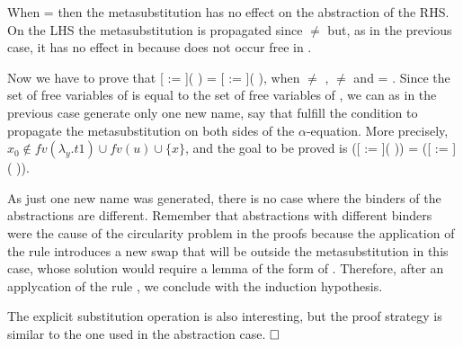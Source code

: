 \begin{coqdoccode}
\end{coqdoccode}
When  =  then the metasubstitution has no effect on the abstraction of the RHS. On the LHS the metasubstitution is propagated since  \ensuremath{\not=}  but, as in the previous case, it has no effect in  because  does not occur free in .
\begin{coqdoccode}
\end{coqdoccode}
Now we have to prove that [ := ](  ) = [ := ](  ), when  \ensuremath{\not=} ,  \ensuremath{\not=}  and    =   . Since the set of free variables of    is equal to the set of free variables of   , we can as in the previous case generate only one new name, say  that fulfill the condition to propagate the metasubstitution on both sides of the $\alpha$-equation. More precisely, $x_0 \notin fv(\lambda_y.t1) \cup fv(u) \cup \{x\}$, and the goal to be proved is   ([ := ](   )) =   ([ := ](   )).
\begin{coqdoccode}
\end{coqdoccode}
As just one new name was generated, there is no case where the binders of the abstractions are different. Remember that abstractions with different binders were the cause of the circularity problem in the proofs because the application of the rule  introduces a new swap that will be outside the metasubstitution in this case, whose solution would require a lemma of the form of . Therefore, after an applycation of the rule , we conclude with the induction hypothesis.
\begin{coqdoccode}
\end{coqdoccode}
The explicit substitution operation is also interesting, but the proof strategy is similar to the one used in the abstraction case. $\hfill\Box$
